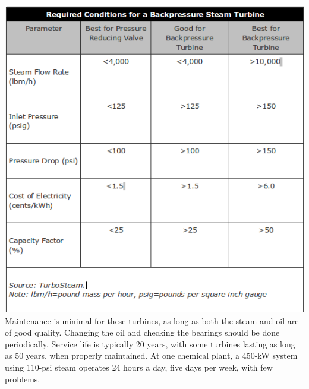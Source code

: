 \documentclass[english,11pt]{report}
\begin{document}

\includegraphics[width = 6in]{dmt1.png}
\\[1em]
Maintenance is minimal for these turbines, as long as both the steam and oil are of good quality. Changing the oil and checking the bearings should be done periodically. Service life is typically 20 years, with some turbines lasting as long as 50 years, when properly maintained. At one chemical plant, a 450-kW system using 110-psi steam operates 24 hours a day, five days per week, with few problems.
\end{document}

